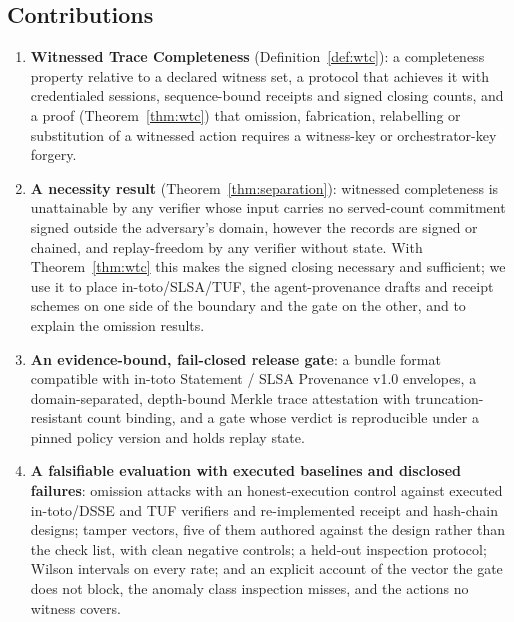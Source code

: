 \documentclass[letterpaper,10pt,twocolumn]{article}
\theoremstyle{definition}
\begin{document}
\subsection{Contributions}
\begin{enumerate}
    \item \textbf{Witnessed Trace Completeness} (Definition~\ref{def:wtc}): a completeness property relative to a declared witness set, a protocol that achieves it with credentialed sessions, sequence-bound receipts and signed closing counts, and a proof (Theorem~\ref{thm:wtc}) that omission, fabrication, relabelling or substitution of a witnessed action requires a witness-key or orchestrator-key forgery.
    \item \textbf{A necessity result} (Theorem~\ref{thm:separation}): witnessed completeness is unattainable by any verifier whose input carries no served-count commitment signed outside the adversary's domain, however the records are signed or chained, and replay-freedom by any verifier without state. With Theorem~\ref{thm:wtc} this makes the signed closing necessary and sufficient; we use it to place in-toto/SLSA/TUF, the agent-provenance drafts and receipt schemes on one side of the boundary and the gate on the other, and to explain the omission results.
    \item \textbf{An evidence-bound, fail-closed release gate}: a bundle format compatible with in-toto Statement / SLSA Provenance v1.0 envelopes, a domain-separated, depth-bound Merkle trace attestation with truncation-resistant count binding, and a gate whose verdict is reproducible under a pinned policy version and holds replay state.
    \item \textbf{A falsifiable evaluation with executed baselines and disclosed failures}: \omVectors{} omission attacks with an honest-execution control against executed in-toto/DSSE and TUF verifiers and re-implemented receipt and hash-chain designs; \scoredVectors{} tamper vectors, five of them authored against the design rather than the check list, with clean negative controls; a held-out inspection protocol; Wilson intervals on every rate; and an explicit account of the vector the gate does not block, the anomaly class inspection misses, and the actions no witness covers.
\end{enumerate}
\end{document}
